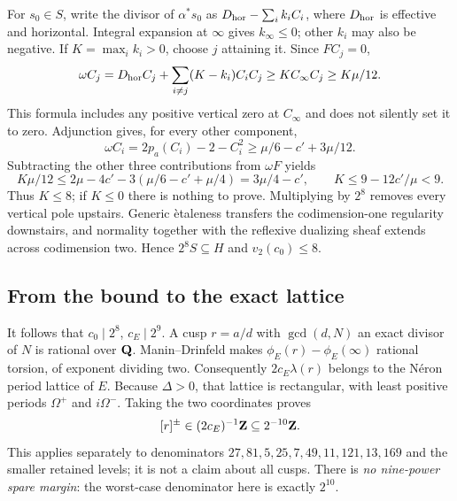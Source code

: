 For $s_0\in S$, write the divisor of $\alpha^*s_0$ as
$D_{\rm hor}-\sum_i k_i C_i$, where $D_{\rm hor}$ is effective and horizontal. Integral expansion at $\infty$ gives $k_\infty\le0$; other $k_i$ may also be negative. If $K=\max_i k_i>0$, choose $j$ attaining it. Since $FC_j=0$,
\[
 \omega C_j=D_{\rm hor}C_j+\sum_{i\ne j}(K-k_i)C_iC_j
 \ge K C_\infty C_j\ge K\mu/12.
\]
This formula includes any positive vertical zero at $C_\infty$ and does not silently set it to zero. Adjunction gives, for every other component,
\[
 \omega C_i=2p_a(C_i)-2-C_i^2
 \ge\mu/6-c'+3\mu/12.
\]
Subtracting the other three contributions from $\omega F$ yields
\[
 K\mu/12\le 2\mu-4c'-3(\mu/6-c'+\mu/4)
 =3\mu/4-c',\qquad K\le9-12c'/\mu<9.
\]
Thus $K\le8$; if $K\le0$ there is nothing to prove. Multiplying by $2^8$ removes every vertical pole upstairs. Generic \`etaleness transfers the codimension-one regularity downstairs, and normality together with the reflexive dualizing sheaf extends across codimension two. Hence $2^8S\subseteq H$ and $v_2(c_0)\le8$.

\subsection{From the bound to the exact lattice}
It follows that $c_0\mid2^8$, $c_E\mid2^9$. A cusp $r=a/d$ with $\gcd(d,N)$ an exact divisor of $N$ is rational over $\mathbf{Q}$. Manin--Drinfeld makes $\phi_E(r)-\phi_E(\infty)$ rational torsion, of exponent dividing two. Consequently $2c_E\lambda(r)$ belongs to the N\'eron period lattice of $E$. Because $\Delta>0$, that lattice is rectangular, with least positive periods $\Omega^+$ and $i\Omega^-$. Taking the two coordinates proves
\[
 [r]^\pm\in(2c_E)^{-1}\mathbf{Z}\subseteq2^{-10}\mathbf{Z}.
\]
This applies separately to denominators $27,81,5,25,7,49,11,121,13,169$ and the smaller retained levels; it is not a claim about all cusps. There is \emph{no nine-power spare margin}: the worst-case denominator here is exactly $2^{10}$.
